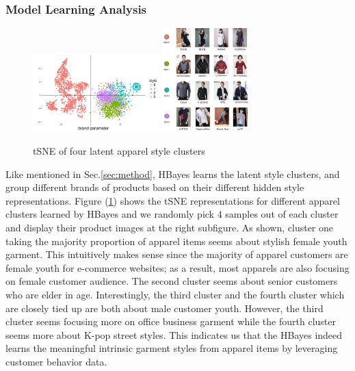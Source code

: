 \subsubsection{Model Learning Analysis}
\begin{figure}
\includegraphics[width=0.58\columnwidth,height=3cm]{fig/brand_tsne}
\includegraphics[width=0.39\columnwidth,height=4cm]{fig/style-brand}
\caption{tSNE of four latent apparel style clusters}
\label{fig:tsne-represntation-style-cluster}
\end{figure}

Like mentioned in Sec.\ref{sec:method}, HBayes learns the latent style clusters, and group different brands of products based on their different hidden style representations.  Figure (\ref{fig:tsne-represntation-style-cluster}) shows the tSNE \cite{maaten2008visualizing} representations for different apparel clusters learned by HBayes and we randomly pick $4$ samples out of each cluster and display their product images at the right subfigure.  As shown, cluster one taking the majority proportion of apparel items seems about stylish female youth garment.  This intuitively makes sense since the majority of apparel customers are female youth for e-commerce websites; as a result, most apparels are also focusing on female customer audience.    The second cluster seems about senior customers who are elder in age.   Interestingly, the third cluster and the fourth cluster which are closely tied up are both about male customer youth.  However, the third cluster seems focusing more on office business garment while the fourth cluster seems more about K-pop street styles.  This indicates us that the HBayes indeed learns the meaningful intrinsic garment styles from apparel items by leveraging customer behavior data.   

